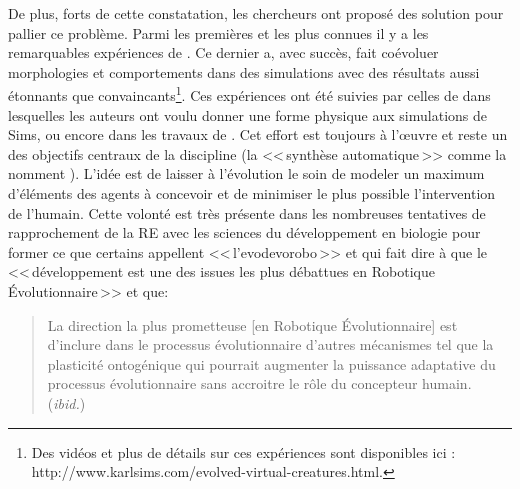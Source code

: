De plus, forts de cette constatation, les chercheurs ont proposé des solution pour pallier ce problème.  Parmi les premières et les plus connues il y a les remarquables expériences de \cite{sims1994evolving3dmorphologyandbehaviorbycompetition}. Ce dernier a, avec succès, fait coévoluer morphologies et comportements dans des simulations avec des résultats aussi étonnants que convaincants\footnote{Des vidéos et plus de détails sur ces expériences sont disponibles ici : \\ http://www.karlsims.com/evolved-virtual-creatures.html.}. Ces expériences ont été suivies par celles de \cite{pollack2000thegolemproject} dans lesquelles les auteurs ont voulu donner une forme physique aux simulations de Sims, ou encore dans les travaux de \citet[ch. 6]{pfeifer2006howthebodyshapesthewaywethink}.
Cet effort est toujours à l'œuvre et reste un des objectifs centraux de la discipline (la <<\,synthèse automatique\,>> comme la nomment \cite{doncieux2009exploringnewhorizonsinevolutionqryrobotics}). L'idée est de laisser à l'évolution le soin de modeler un maximum d'éléments des agents à concevoir et de minimiser le plus possible l'intervention de l'humain. Cette volonté est très présente dans les nombreuses tentatives de rapprochement de la RE avec les sciences du développement en biologie pour former ce que certains appellent <<\,l'evodevorobo\,>> \citep{bredeche11evolutionaryadaptationpopulationrobots} et qui fait dire à \citet[p. 17]{nolfi00evolrobobiolintetechselfmach} que le <<\,développement est une des issues les plus débattues en Robotique \'Evolutionnaire\,>> et que:
\begin{quote}
	La direction la plus prometteuse [en Robotique \'Evolutionnaire] est d'inclure dans le processus évolutionnaire d'autres mécanismes tel que la plasticité ontogénique qui pourrait augmenter la puissance adaptative du processus évolutionnaire sans accroitre le rôle du concepteur humain.
	\\(\emph{ibid.})
\end{quote}

